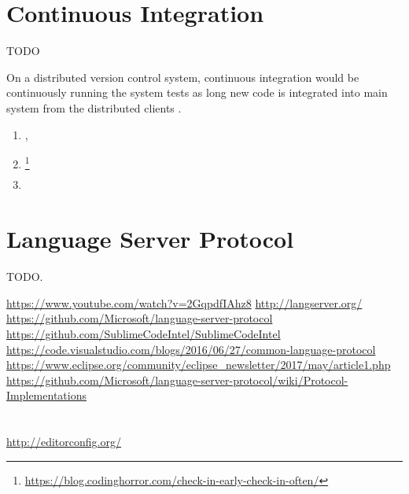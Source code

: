 \section{Continuous Integration}

TODO

On a distributed version control system,
continuous integration would be continuously running the system tests
as long new code is integrated into main system
from the distributed clients \cite{continuousIntegration}.

\begin{enumerate}[leftmargin=*]
    \item {},
    \item \footnote{\url{https://blog.codinghorror.com/check-in-early-check-in-often/}}
    \item \cite{aspectOriented}
\end{enumerate}



\section{Language Server Protocol}

TODO.

\url{https://www.youtube.com/watch?v=2GqpdfIAhz8}
\url{http://langserver.org/}
\url{https://github.com/Microsoft/language-server-protocol}
\url{https://github.com/SublimeCodeIntel/SublimeCodeIntel}
\url{https://code.visualstudio.com/blogs/2016/06/27/common-language-protocol}
\url{https://www.eclipse.org/community/eclipse_newsletter/2017/may/article1.php}
\url{https://github.com/Microsoft/language-server-protocol/wiki/Protocol-Implementations}



\section{}

\url{http://editorconfig.org/}
\cite{prettyPrintingOfVisualSentences}
\cite{anAbstractPrettyPrinter}
\cite{improvingRefactoringSpeed}

